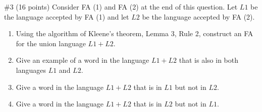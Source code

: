 \begin{problem}{\#3 (16 points)}
    Consider FA (1) and FA (2) at the end of this question.
    Let \(L1\) be the language accepted by FA (1) and let \(L2\) be the language accepted by FA (2).
    \begin{enumerate}[label={\bf \alph*)}]
        \item Using the algorithm of Kleene's theorem, Lemma 3, Rule 2, construct an FA for the union language \(L1 + L2\).
        \item Give an example of a word in the language \(L1 + L2\) that is also in both languages \(L1\) and \(L2\).
        \item Give a word in the language \(L1+L2\) that is in \(L1\) but not in \(L2\).
        \item Give a word in the language \(L1+L2\) that is in \(L2\) but not in \(L1\).
    \end{enumerate}
    
\end{problem}
\begin{figure}[h!]
    \hfill
    \hfill
    \hfill
\end{figure}
\vspace{2em}
